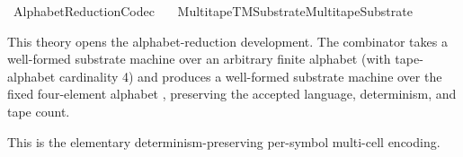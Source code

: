 %
\begin{isabellebody}%
%
%
\isadelimtheory
%
\endisadelimtheory
%
\isatagtheory
{}\isamarkupfalse%
\ AlphabetReduction{\isacharunderscore}{\kern0pt}Codec\isanewline
\ \ \ {\isachardoublequoteopen}Multitape{\isacharunderscore}{\kern0pt}TM{\isacharunderscore}{\kern0pt}Substrate{\isachardot}{\kern0pt}Multitape{\isacharunderscore}{\kern0pt}Substrate{\isachardoublequoteclose}\isanewline
{}%
\endisatagtheory
{\isafoldtheory}%
%
\isadelimtheory
%
\endisadelimtheory
%
\isadelimdocument
%
\endisadelimdocument
%
\isatagdocument
%
\isamarkuptrue%
%
\endisatagdocument
{\isafolddocument}%
%
\isadelimdocument
%
\endisadelimdocument
%
\begin{isamarkuptext}%
This theory opens the alphabet-reduction development.  The
   combinator takes a well-formed substrate
  machine over an arbitrary finite alphabet  (with
  tape-alphabet cardinality \isa{{\isasymge}} 4) and produces a
  well-formed substrate machine over the fixed four-element alphabet
  , preserving the accepted language, determinism, and
  tape count.

  This is the elementary determinism-preserving per-symbol multi-cell
  encoding.


\end{isamarkuptext}
\end{isabellebody}

